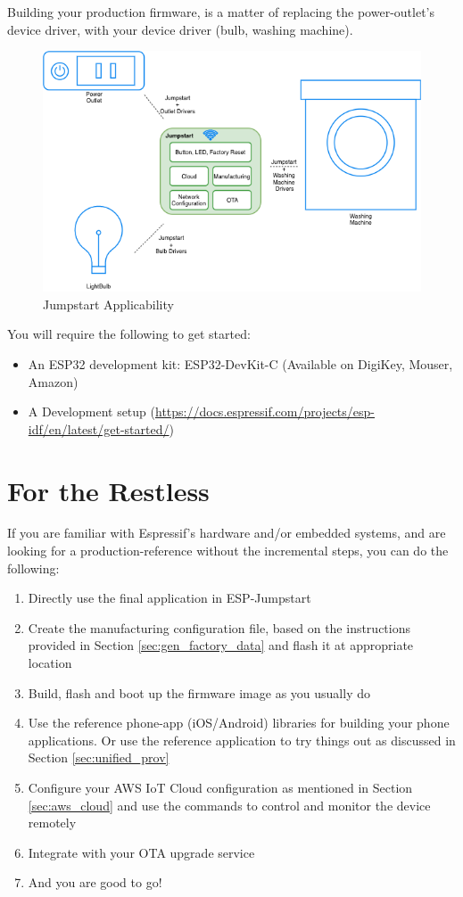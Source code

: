 \documentclass[main.tex]{subfiles}
\begin{document}
Building your production firmware, is a matter of replacing the power-outlet's device driver, with your device driver (bulb, washing machine).

\begin{figure}[h!]
    \centering
    \includegraphics[scale=0.7]{../../_static/jumpstart-outlet-blocks.png}
    \caption{Jumpstart Applicability}
    \label{fig:jumpstart_applicability}
\end{figure}

You will require the following to get started:
\begin{itemize}
\item An ESP32 development kit: ESP32-DevKit-C (Available on DigiKey, Mouser, Amazon)
\item A Development setup (\url{https://docs.espressif.com/projects/esp-idf/en/latest/get-started/})
\end{itemize}

\section{For the Restless}
If you are familiar with Espressif's hardware and/or embedded systems, and are looking for a production-reference without the incremental steps, you can do the following: 

\begin{enumerate}
    \item Directly use the final application in ESP-Jumpstart
    \item Create the manufacturing configuration file, based on the instructions provided in Section \ref{sec:gen_factory_data} and flash it at appropriate location
    \item Build, flash and boot up the firmware image as you usually do
    \item Use the reference phone-app (iOS/Android) libraries for building your phone applications. Or use the reference application to try things out as discussed in Section \ref{sec:unified_prov}
    \item Configure your AWS IoT Cloud configuration as mentioned in Section \ref{sec:aws_cloud} and use the commands to control and monitor the device remotely
    \item Integrate with your OTA upgrade service
    \item And you are good to go!
\end{enumerate}
\end{document}
